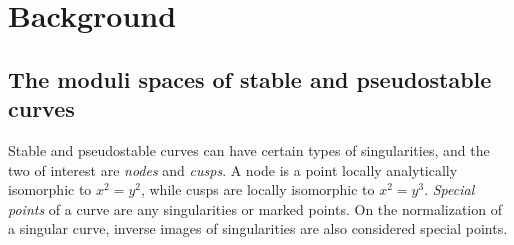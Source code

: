 \documentclass[leqno,12pt]{amsart}
\theoremstyle{remark}
\newtheorem{result}{Result}
\numberwithin{equation}{section}
\DeclareMathOperator{\ps}{ps}
\begin{document}

\section{Background}\label{sec:Background}

\subsection{The moduli spaces of stable and pseudostable curves} Stable and pseudostable curves can have certain types of singularities, and the two of interest are \textit{nodes} and \textit{cusps}. A node is a point locally analytically isomorphic to $x^2 = y^2$, while cusps are locally isomorphic to $x^2 = y^3$. \textit{Special points} of  a curve are any singularities or marked points. On the normalization of a singular curve, inverse images of singularities are also considered special points. 
\end{document}
